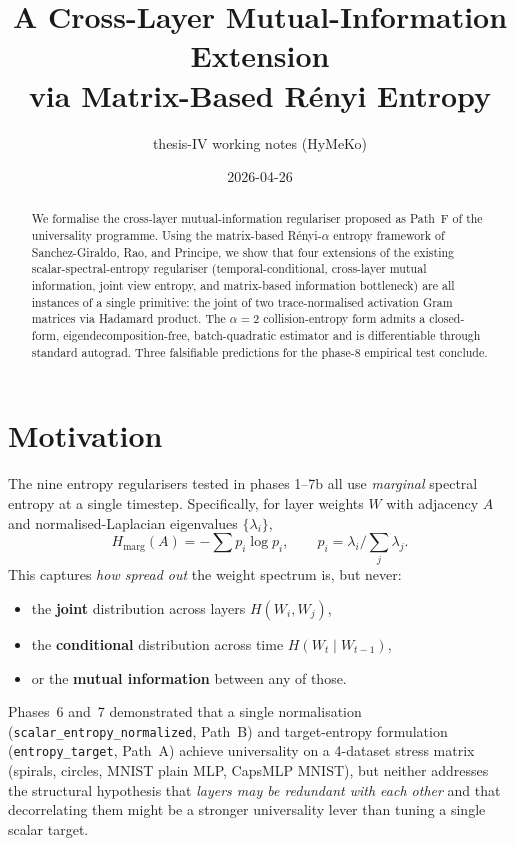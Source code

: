 \documentclass[11pt,a4paper]{article}
\title{A Cross-Layer Mutual-Information Extension\\[2pt]
       via Matrix-Based R\'enyi Entropy}
\author{thesis-IV working notes (HyMeKo)}
\date{2026-04-26}
\begin{document}
\maketitle

\begin{abstract}
We formalise the cross-layer mutual-information regulariser proposed as
Path~F of the universality programme. Using the matrix-based R\'enyi-$\alpha$
entropy framework of Sanchez-Giraldo, Rao, and Principe, we show that
four extensions of the existing scalar-spectral-entropy regulariser
(temporal-conditional, cross-layer mutual information, joint view
entropy, and matrix-based information bottleneck) are all instances of
a single primitive: the joint of two trace-normalised activation Gram
matrices via Hadamard product. The $\alpha=2$ collision-entropy form
admits a closed-form, eigendecomposition-free, batch-quadratic estimator
and is differentiable through standard autograd. Three falsifiable
predictions for the phase-8 empirical test conclude.
\end{abstract}

\section{Motivation}

The nine entropy regularisers tested in phases 1--7b all use
\emph{marginal} spectral entropy at a single timestep. Specifically, for
layer weights $W$ with adjacency $A$ and normalised-Laplacian eigenvalues
$\{\lambda_i\}$,
\[
H_{\text{marg}}(A) = -\sum p_i \log p_i,
\qquad p_i = \lambda_i / \textstyle\sum_j \lambda_j .
\]
This captures \emph{how spread out} the weight spectrum is, but never:
\begin{itemize}
  \item the \textbf{joint} distribution across layers $H(W_i, W_j)$,
  \item the \textbf{conditional} distribution across time
        $H(W_t \mid W_{t-1})$,
  \item or the \textbf{mutual information} between any of those.
\end{itemize}
Phases~6 and~7 demonstrated that a single normalisation
(\texttt{scalar\_entropy\_normalized}, Path~B) and target-entropy
formulation (\texttt{entropy\_target}, Path~A) achieve universality on a
4-dataset stress matrix (spirals, circles, MNIST plain MLP, CapsMLP MNIST),
but neither addresses the structural hypothesis that \emph{layers may be
redundant with each other} and that decorrelating them might be a stronger
universality lever than tuning a single scalar target.
\end{document}
